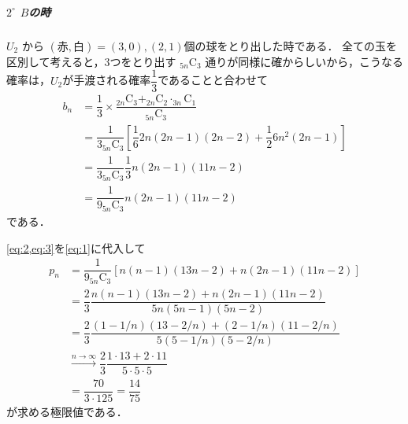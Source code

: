 \documentclass[../../main.tex]{subfiles}
\begin{document}
\subparagraph{$2^{\circ}$ $B$の時}

$U_2$ から $(\text{赤}, \text{白}) = (3, 0), (2, 1)$個の球をとり出した時である．
全ての玉を区別して考えると，3つをとり出す ${}_{5n}\mathrm{C}_3$ 通りが同様に確からしいから，こうなる確率は，$U_2$が手渡される確率$\dfrac{1}{3}$であることと合わせて
\begin{align}
  b_n
  & = \dfrac{1}{3} \times \dfrac{_{2n}\mathrm{C}_3 + _{2n}\mathrm{C}_2 \cdot _{3n}\mathrm{C}_1}{{}_{5n}\mathrm{C}_3} \\
  & = \dfrac{1}{3{}_{5n}\mathrm{C}_3} \left[\dfrac{1}{6}2n(2n-1)(2n-2) + \dfrac{1}{2}6n^2(2n-1)\right] \\
  & = \dfrac{1}{3{}_{5n}\mathrm{C}_3} \dfrac{1}{3}n(2n-1)(11n-2) \\
  & = \dfrac{1}{9{}_{5n}\mathrm{C}_3} n(2n-1)(11n-2) \label{eq:3}
\end{align}
である．
\casesend

\cref{eq:2,eq:3}を\cref{eq:1}に代入して
\begin{align}
  p_n
  &= \dfrac{1}{9 {}_{5n}\mathrm{C}_3}\left[ n(n-1)(13n-2) + n(2n-1)(11n-2) \right] \\
  &= \dfrac{2}{3}\dfrac{n(n-1)(13n-2) + n(2n-1)(11n-2)}{5n(5n-1)(5n-2)} \\
  &= \dfrac{2}{3}\dfrac{(1-1/n)(13-2/n) + (2-1/n)(11-2/n)}{5(5-1/n)(5-2/n)} \\
  &\xrightarrow{n\to\infty}
  \dfrac{2}{3}\dfrac{1\cdot 13 + 2\cdot 11}{5\cdot 5\cdot 5} \\
  &= \dfrac{70}{3\cdot 125} = \dfrac{14}{75}
\end{align}
が求める極限値である．
\end{document}
